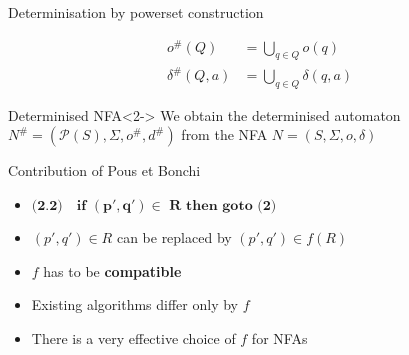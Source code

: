 \documentclass[compress]{beamer}
\begin{document}
\begin{frame}{Determinisation by powerset construction}
  \begin{figure}
    \begin{align*}
      o^\#(Q) &= \bigcup_{q \in Q} o(q)\\
      \delta^\#(Q, a) &= \bigcup_{q \in Q} \delta(q, a)
    \end{align*}
  \end{figure}

  \begin{block}{Determinised NFA}<2->
    We obtain the determinised automaton $N^\# = (\mathcal{P}(S), \Sigma, o^{\#}, d^{\#})$
      from the NFA $N = (S, \Sigma, o, \delta)$
  \end{block}
\end{frame}

\begin{frame}{Contribution of Pous et Bonchi}
  \begin{itemize}
      \item<1-> $\textbf{(2.2)}\quad \textbf{if } \mathbf{(p', q') \in} \textbf{ R} \textbf{ then goto (2)}$
      \item<2-> $(p', q') \in R$ can be replaced by $(p', q') \in f(R)$
      \item<2-> $f$ has to be \textbf{compatible}
      \item<3-> Existing algorithms differ only by $f$
      \item<4-> There is a very effective choice of $f$ for NFAs
    \end{itemize}
\end{frame}
\end{document}
